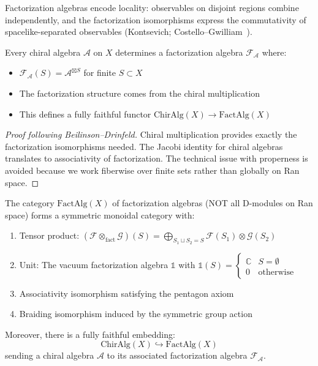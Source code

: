 \begin{remark}
Factorization algebras encode locality: observables
on disjoint regions combine independently, and the factorization isomorphisms express the commutativity of spacelike-separated observables (Kontsevich; Costello--Gwilliam~\cite{CG17}).
\end{remark}

\begin{theorem}\label{thm:chiral-as-fact}
Every chiral algebra $\mathcal{A}$ on $X$ determines a factorization algebra $\mathcal{F}_\mathcal{A}$ where:
\begin{itemize}
\item $\mathcal{F}_\mathcal{A}(S) = \mathcal{A}^{\boxtimes S}$ for finite $S \subset X$
\item The factorization structure comes from the chiral multiplication
\item This defines a fully faithful functor $\text{ChirAlg}(X) \to \text{FactAlg}(X)$
\end{itemize}
\end{theorem}

\begin{proof}[Proof following Beilinson--Drinfeld]
Chiral multiplication provides exactly the factorization isomorphisms needed.
The Jacobi identity for chiral algebras translates to associativity of factorization. The technical 
issue with properness is avoided because we work fiberwise over finite sets rather than globally on Ran space.
\end{proof}


\begin{theorem}\label{thm:fact-monoidal-corrected}
The category $\text{FactAlg}(X)$ of factorization algebras (NOT all D-modules on Ran space) forms a symmetric monoidal 
category with:
\begin{enumerate}
\item Tensor product: $(\mathcal{F} \otimes_{\text{fact}} \mathcal{G})(S) = \bigoplus_{S_1 \sqcup S_2 = S} \mathcal{F}(S_1) \otimes \mathcal{G}(S_2)$
\item Unit: The vacuum factorization algebra $\mathbb{1}$ with $\mathbb{1}(S) = \begin{cases} \mathbb{C} & S = \emptyset \\ 0 & \text{otherwise} \end{cases}$
\item Associativity isomorphism satisfying the pentagon axiom
\item Braiding isomorphism induced by the symmetric group action
\end{enumerate}

Moreover, there is a fully faithful embedding:
\[\text{ChirAlg}(X) \hookrightarrow \text{FactAlg}(X)\]
sending a chiral algebra $\mathcal{A}$ to its associated factorization algebra $\mathcal{F}_{\mathcal{A}}$.
\end{theorem}


